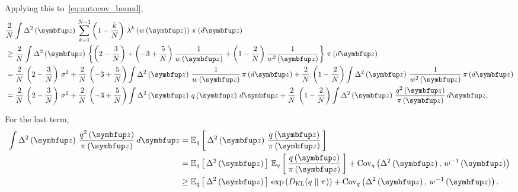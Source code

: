 \begin{proofEnd}
Applying this to~\cref{eq:autocov_bound},
\begin{align}
  &\frac{2}{N}
  \int
  \Delta^2\left(\vz\right) \,
   \sum_{k=1}^{N-1} 
  \left(1 - \frac{k}{N}\right) \, \lambda^k\left(w\left(\vz\right)\right)
  \, \pi\left(d\vz\right)
  \\
  &\geq
  \frac{2}{N}
  \int
  \Delta^2\left(\vz\right) \,
  \left\{
  \left(2 - \frac{3}{N}\right)
  +
  \left(-3 + \frac{5}{N}\right) \frac{1}{w\left(\vz\right)}
  +
  \left(1 - \frac{2}{N}\right)  \frac{1}{w^2\left(\vz\right)}
  \right\}
  \, \pi\left(d\vz\right)
  \\
  &=
  \frac{2}{N}\,
  \left(2 - \frac{3}{N}\right) \, \sigma^2
  +
  \frac{2}{N}\,
  \left(-3 + \frac{5}{N}\right) 
  \int
  \Delta^2\left(\vz\right) \,
  \frac{1}{w\left(\vz\right)}
  \, \pi\left(d\vz\right)
  +
  \frac{2}{N}\,
  \left(1 - \frac{2}{N}\right)
  \int
  \Delta^2\left(\vz\right) \,
  \frac{1}{w^2\left(\vz\right)}
  \, \pi\left(d\vz\right)
  \\
  &=
  \frac{2}{N}\,
  \left(2 - \frac{3}{N}\right) \, \sigma^2
  +
  \frac{2}{N}\,
  \left(-3 + \frac{5}{N}\right) 
  \int
  \Delta^2\left(\vz\right) \,
  q\left(\vz\right)\,d\vz
  +
  \frac{2}{N}\,
  \left(1 - \frac{2}{N}\right)
  \int
  \Delta^2\left(\vz\right) \,
  \frac{q^2\left(\vz\right)}{\pi\left(\vz\right)}\,
  d\vz.
\end{align}

For the last term,
\begin{align}
  \int
  \Delta^2\left(\vz\right) \,
  \frac{q^2\left(\vz\right)}{\pi\left(\vz\right)}\,
  d\vz
  &=
  \Esub{q}{
    \Delta^2\left(\vz\right) 
    \, \frac{q\left(\vz\right)}{\pi\left(\vz\right)}
  }
  \\
  &=
  \Esub{q}{
    \Delta^2\left(\vz\right) 
  }
  \,
  \Esub{q}{
    \frac{q\left(\vz\right)}{\pi\left(\vz\right)}
  }
  +
  \text{Cov}_{q}\left(\Delta^2\left(\vz\right),\, w^{-1}\left(\vz\right)\right)
  \\
  &\geq
  \Esub{q}{
    \Delta^2\left(\vz\right) 
  }
  \,
  \exp\left(
    \DKL{q}{\pi}
  \right)
  +
  \text{Cov}_{q}\left(\Delta^2\left(\vz\right),\, w^{-1}\left(\vz\right)\right).
\end{align}


\end{proofEnd}
